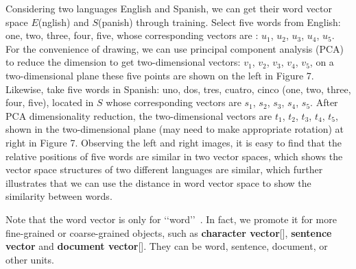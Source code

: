 Considering two languages English and Spanish, we can get their word vector space $E$(nglish) and $S$(panish) through training. Select five words from English: one, two, three, four, five, whose corresponding vectors are : $u_1$, $u_2$, $u_3$, $u_4$, $u_5$. For the convenience of drawing, we can use principal component analysis (PCA) to reduce the dimension to get two-dimensional vectors: $v_1$, $v_2$, $v_3$, $v_4$, $v_5$, on a two-dimensional plane these five points are shown on the left in Figure 7. Likewise, take five words in Spanish: uno, dos, tres, cuatro, cinco (one, two, three, four, five), located in $S$ whose corresponding vectors are $s_1$, $s_2$, $s_3$, $s_4$, $s_5$. After PCA dimensionality reduction, the two-dimensional vectors are $t_1$, $t_2$, $t_3$, $t_4$, $t_5$, shown in the two-dimensional plane (may need to make appropriate rotation) at right in Figure 7. Observing the left and right images, it is easy to find that the relative positions of five words are similar in two vector spaces, which shows the vector space structures of two different languages are similar, which further illustrates that we can use the distance in word vector space to show the similarity between words.

Note that the word vector is only for \lq\lq word\rq\rq\ . In fact, we promote it for more fine-grained or coarse-grained objects, such as \textbf{character vector}[], \textbf{sentence vector} and \textbf{document vector}[]. They can be word, sentence, document, or other units.

